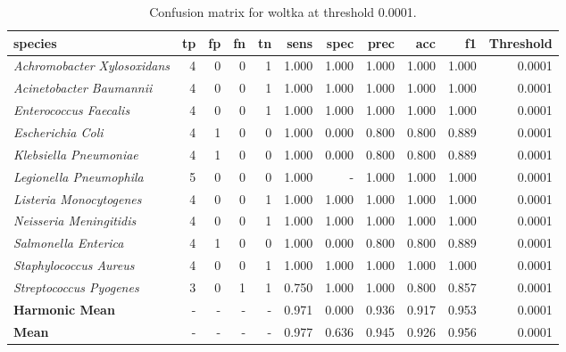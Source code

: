 \begin{table}[H]
\centering
\begin{tabular}{lrrrrrrrrrr}
\hline
\textbf{species} & \textbf{tp} & \textbf{fp} & \textbf{fn} & \textbf{tn} & \textbf{sens} & \textbf{spec} & \textbf{prec} & \textbf{acc} & \textbf{f1} & \textbf{Threshold} \\
\hline
\itshape Achromobacter Xylosoxidans & 4 & 0 & 0 & 1 & 1.000 & 1.000 & 1.000 & 1.000 & 1.000 & 0.0001 \\
\itshape Acinetobacter Baumannii & 4 & 0 & 0 & 1 & 1.000 & 1.000 & 1.000 & 1.000 & 1.000 & 0.0001 \\
\itshape Enterococcus Faecalis & 4 & 0 & 0 & 1 & 1.000 & 1.000 & 1.000 & 1.000 & 1.000 & 0.0001 \\
\itshape Escherichia Coli & 4 & 1 & 0 & 0 & 1.000 & 0.000 & 0.800 & 0.800 & 0.889 & 0.0001 \\
\itshape Klebsiella Pneumoniae & 4 & 1 & 0 & 0 & 1.000 & 0.000 & 0.800 & 0.800 & 0.889 & 0.0001 \\
\itshape Legionella Pneumophila & 5 & 0 & 0 & 0 & 1.000 & - & 1.000 & 1.000 & 1.000 & 0.0001 \\
\itshape Listeria Monocytogenes & 4 & 0 & 0 & 1 & 1.000 & 1.000 & 1.000 & 1.000 & 1.000 & 0.0001 \\
\itshape Neisseria Meningitidis & 4 & 0 & 0 & 1 & 1.000 & 1.000 & 1.000 & 1.000 & 1.000 & 0.0001 \\
\itshape Salmonella Enterica & 4 & 1 & 0 & 0 & 1.000 & 0.000 & 0.800 & 0.800 & 0.889 & 0.0001 \\
\itshape Staphylococcus Aureus & 4 & 0 & 0 & 1 & 1.000 & 1.000 & 1.000 & 1.000 & 1.000 & 0.0001 \\
\itshape Streptococcus Pyogenes & 3 & 0 & 1 & 1 & 0.750 & 1.000 & 1.000 & 0.800 & 0.857 & 0.0001 \\
\bfseries Harmonic Mean & - & - & - & - & 0.971 & 0.000 & 0.936 & 0.917 & 0.953 & 0.0001 \\
\bfseries Mean & - & - & - & - & 0.977 & 0.636 & 0.945 & 0.926 & 0.956 & 0.0001 \\
\end{tabular}
\caption{Confusion matrix for woltka at threshold 0.0001.}
\label{tab:conf_woltka_0.0001}
\end{table}
